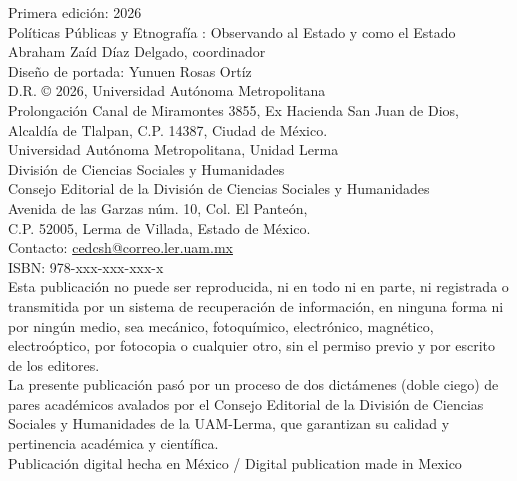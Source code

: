 \begingroup
\begin{singlespace}
\scriptsize
\noindent
Primera edición: 2026\\
Políticas Públicas y Etnografía : Observando al Estado y como el Estado\\
Abraham Zaíd Díaz Delgado, coordinador\\[0.5em]
Diseño de portada: Yunuen Rosas Ortíz\\[0.5em]
D.R. © 2026, Universidad Autónoma Metropolitana\\
Prolongación Canal de Miramontes 3855, Ex Hacienda San Juan de Dios,\\
Alcaldía de Tlalpan, C.P. 14387, Ciudad de México.\\[0.5em]
{\scriptsize Universidad Autónoma Metropolitana, Unidad Lerma}\\
División de Ciencias Sociales y Humanidades\\
Consejo Editorial de la División de Ciencias Sociales y Humanidades\\
Avenida de las Garzas núm. 10, Col. El Panteón,\\
C.P. 52005, Lerma de Villada, Estado de México.\\
Contacto: \href{mailto:cedcsh@correo.ler.uam.mx}{cedcsh@correo.ler.uam.mx}\\[0.8em]
ISBN: 978-xxx-xxx-xxx-x\\[0.8em]
Esta publicación no puede ser reproducida, ni en todo ni en parte, ni registrada o transmitida por un sistema de recuperación de información, en ninguna forma ni por ningún medio, sea mecánico, fotoquímico, electrónico, magnético, electroóptico, por fotocopia o cualquier otro, sin el permiso previo y por escrito de los editores.\\[0.5em]
La presente publicación pasó por un proceso de dos dictámenes (doble ciego) de pares académicos avalados por el Consejo Editorial de la División de Ciencias Sociales y Humanidades de la UAM-Lerma, que garantizan su calidad y pertinencia académica y científica.\\[0.5em]
Publicación digital hecha en México / Digital publication made in Mexico
\end{singlespace}
\endgroup
\clearpage

\clearpage
\thispagestyle{empty}
\null
\clearpage